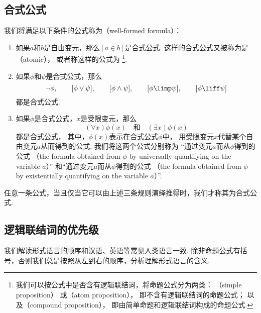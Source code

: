 \subsection{合式公式}
我们将满足以下条件的公式称为（well-formed formula）：%
\begin{enumerate}
	\item 如果\(a\)和\(b\)是自由变元，那么\([a \in b]\)是合式公式.
	这样的合式公式又被称为是（atomic），
	或者称这样的公式为
	\footnote{%
		我们可以按公式中是否含有逻辑联结词，将命题公式分为两类：
		（simple proposition）%
		或（atom proposition），
		即不含有逻辑联结词的命题公式；
		以及（compound proposition），
		即由简单命题和逻辑联结词构成的命题公式.
	}.

	\item 如果\(\phi\)和\(\psi\)是合式公式，那么\[
		\neg \phi, \qquad
		[\phi \lor \psi], \qquad
		[\phi \land \psi], \qquad
		[\phi \limp \psi], \qquad
		[\phi \liff \psi]
	\]都是合式公式.

	\item 如果\(\phi\)是合式公式，\(x\)是受限变元，那么\[
		(\forall x) \phi(x)
		\quad\text{和}\quad
		(\exists x) \phi(x)
	\]都是合式公式，
	其中，\(\phi(x)\)表示在合式公式\(\phi\)中，
	用受限变元\(x\)代替某个自由变元\(a\)从而得到的公式.
	我们将这两个公式分别称为%
	“通过变元\(a\)而从\(\phi\)得到的公式%
	（the formula obtained from \(\phi\) by universally quantifying on the variable \(a\)）”%
	和“通过变元\(a\)而从\(\phi\)得到的公式%
	（the formula obtained from \(\phi\) by existentially quantifying on the variable \(a\)）”.
\end{enumerate}
任意一条公式，当且仅当它可以由上述三条规则演绎推得时，我们才称其为合式公式.

\subsection{逻辑联结词的优先级}
我们解读形式语言的顺序和汉语、英语等常见人类语言一致.
除非命题公式有括号，否则我们总是按照从左到右的顺序，分析理解形式语言的含义.

